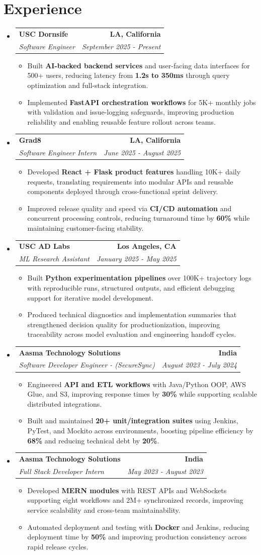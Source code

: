 \documentclass[letterpaper,10pt]{article}
\makeatletter
\newcommand{\resumeItem}[1]{\item\small{{#1 \vspace{-2pt}}}}
\newcommand{\resumeSubheading}[4]{\vspace{-2pt}\item\begin{tabular*}{1.0\textwidth}[t]{l@{\extracolsep{\fill}}r}\textbf{#1} & \textbf{\small #2} \\\textit{\small#3} & \textit{\small #4} \\\end{tabular*}\vspace{-3pt}}
\newcommand{\resumeSubHeadingListStart}{\begin{itemize}[leftmargin=0.0in, label={}]}
\newcommand{\resumeSubHeadingListEnd}{\end{itemize}}
\newcommand{\resumeItemListStart}{\begin{itemize}[leftmargin=0.15in,label=\textbullet,itemsep=0pt,topsep=0pt,parsep=0pt,partopsep=0pt]}
\newcommand{\resumeItemListEnd}{\end{itemize}\vspace{-2pt}}
\makeatother
\begin{document}
\section{Experience}
\resumeSubHeadingListStart
\resumeSubheading{USC Dornsife}{LA, California}{Software Engineer}{September 2025 - Present}
\resumeItemListStart
\resumeItem{Built \textbf{AI-backed backend services} and user-facing data interfaces for 500+ users, reducing latency from \textbf{1.2s to 350ms} through query optimization and full-stack integration.}
\resumeItem{Implemented \textbf{FastAPI orchestration workflows} for 5K+ monthly jobs with validation and issue-logging safeguards, improving production reliability and enabling reusable feature rollout across teams.}
\resumeItemListEnd
\resumeSubheading{Grad8}{LA, California}{Software Engineer Intern}{June 2025 - August 2025}
\resumeItemListStart
\resumeItem{Developed \textbf{React + Flask product features} handling 10K+ daily requests, translating requirements into modular APIs and reusable components deployed through cross-functional sprint delivery.}
\resumeItem{Improved release quality and speed via \textbf{CI/CD automation} and concurrent processing controls, reducing turnaround time by \textbf{60\%} while maintaining customer-facing stability.}
\resumeItemListEnd
\resumeSubheading{USC AD Labs}{Los Angeles, CA}{ML Research Assistant}{January 2025 - May 2025}
\resumeItemListStart
\resumeItem{Built \textbf{Python experimentation pipelines} over 100K+ trajectory logs with reproducible runs, structured outputs, and efficient debugging support for iterative model development.}
\resumeItem{Produced technical diagnostics and implementation summaries that strengthened decision quality for productionization, improving traceability across model evaluation and engineering handoff cycles.}
\resumeItemListEnd
\resumeSubheading{Aasma Technology Solutions}{India}{Software Developer Engineer - (SecureSync)}{August 2023 - July 2024}
\resumeItemListStart
\resumeItem{Engineered \textbf{API and ETL workflows} with Java/Python OOP, AWS Glue, and S3, improving response times by \textbf{30\%} while supporting scalable distributed integrations.}
\resumeItem{Built and maintained \textbf{20+ unit/integration suites} using Jenkins, PyTest, and Mockito across environments, boosting pipeline efficiency by \textbf{68\%} and reducing technical debt by \textbf{20\%}.}
\resumeItemListEnd
\resumeSubheading{Aasma Technology Solutions}{India}{Full Stack Developer Intern}{May 2023 - August 2023}
\resumeItemListStart
\resumeItem{Developed \textbf{MERN modules} with REST APIs and WebSockets supporting eight workflows and 2M+ synchronized records, improving service scalability and cross-team maintainability.}
\resumeItem{Automated deployment and testing with \textbf{Docker} and Jenkins, reducing deployment time by \textbf{50\%} and improving production consistency across rapid release cycles.}
\resumeItemListEnd
\resumeSubHeadingListEnd
\vspace{-15pt}
\end{document}
